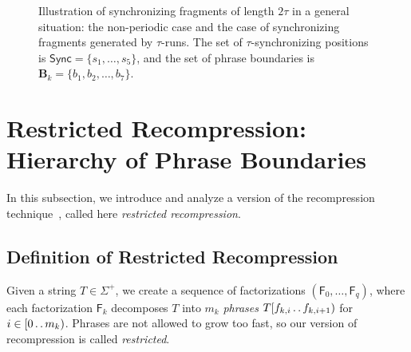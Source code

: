 \documentclass[a4paper]{article}
\theoremstyle{definition}
\theoremstyle{remark}
\newcommand{\B}{\mathbf{B}}
\newcommand{\dd}{\mathinner{\ldotp\ldotp}}
\renewcommand{\S}{\mathsf{Sync}}
\renewcommand{\S}{\mathsf{Sync}}
\newcommand{\F}{\mathsf{F}}
\begin{document}
\begin{figure}[h]
 \caption{
  Illustration of synchronizing fragments of length $2\tau$ in a general situation: the non-periodic case and the case of synchronizing fragments generated by $\tau$-runs.
  The set of $\tau$-synchronizing positions is $\S=\{s_1,\ldots,s_5\}$, and the set 
  of phrase boundaries is $\B_k=\{b_1,b_2,\ldots,b_7\}$.
}\label{fig:general}
\end{figure}

 
\section{Restricted Recompression: Hierarchy of Phrase Boundaries}\label{sec:recompression}

\newcommand{\Symb}{\mathbf{S}}
\newcommand{\Act}{\mathbf{A}}
\newcommand{\Left}{\mathbf{L}}
\newcommand{\Right}{\mathbf{R}}
\newcommand{\rle}{\mathsf{\mathbf{RunShrink}}}
\newcommand{\pc}{\mathsf{\mathbf{PairShrink}}}
\newcommand{\Zp}{\mathbb{Z}_{+}}

In this subsection, we introduce and analyze a version of the recompression technique~\cite{DBLP:journals/jacm/Jez16}, called here \emph{restricted recompression}.

\subsection{Definition of Restricted Recompression}
Given a string $T\in \Sigma^+$, we create a sequence of factorizations $(\F_0,\ldots,\F_q)$,
where each factorization $\F_k$ decomposes $T$ into $m_k$ \emph{phrases} $T[f_{k,i}\dd f_{k,i+1})$ for $i\in [0\dd m_k)$.
Phrases are not allowed to grow too fast, so our version of recompression is called \emph{restricted}.
\end{document}
